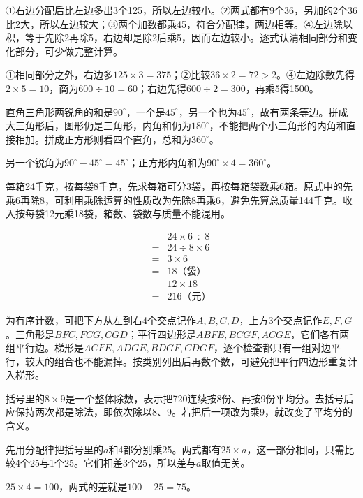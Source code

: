 \documentclass[multi=snippet,border=0pt]{standalone}
\newenvironment{snippet}[3]{\begin{minipage}{#1bp}\color{answerred}\fontsize{#2}{#3}\selectfont\raggedright}{\end{minipage}}
\begin{document}
\begin{snippet}{505}{11.5}{14}①右边分配后比左边多出3个125，所以左边较小。②两式都有9个36，另加的2个36比2大，所以左边较大；③两个加数都乘45，符合分配律，两边相等。④左边除以积，等于先除2再除5，右边却是除2后乘5，因而左边较小。逐式认清相同部分和变化部分，可少做完整计算。\par ①相同部分之外，右边多\(125\times3=375\)；②比较\(36\times2=72>2\)。④左边除数先得\(2\times5=10\)，商为\(600\div10=60\)；右边先得\(600\div2=300\)，再乘5得1500。\end{snippet}
\begin{snippet}{505}{11.5}{14}直角三角形两锐角的和是\(90^\circ\)，一个是\(45^\circ\)，另一个也为\(45^\circ\)，故有两条等边。拼成大三角形后，图形仍是三角形，内角和仍为\(180^\circ\)，不能把两个小三角形的内角和直接相加。拼成正方形则看四个直角，总和为\(360^\circ\)。\par 另一个锐角为\(90^\circ-45^\circ=45^\circ\)；正方形内角和为\(90^\circ\times4=360^\circ\)。\end{snippet}
\begin{snippet}{505}{11.5}{14}每箱24千克，按每袋8千克，先求每箱可分3袋，再按每箱袋数乘6箱。原式中的先乘6再除8，可利用乘除运算的性质改为先除8再乘6，避免先算总质量144千克。收入按每袋12元乘18袋，箱数、袋数与质量不能混用。\par \[\begin{aligned}&24\times6\div8\\={}&24\div8\times6\\={}&3\times6\\={}&18\text{（袋）}\\&12\times18\\={}&216\text{（元）}\end{aligned}\]\end{snippet}
\begin{snippet}{505}{11.5}{14}为有序计数，可把下方从左到右4个交点记作\(A,B,C,D\)，上方3个交点记作\(E,F,G\)。三角形是\(BFC,FCG,CGD\)；平行四边形是\(ABFE,BCGF,ACGE\)，它们各有两组平行边。梯形是\(ACFE,ADGE,BDGF,CDGF\)，逐个检查都只有一组对边平行，较大的组合也不能漏掉。按类别列出后再数个数，可避免把平行四边形重复计入梯形。\end{snippet}
\begin{snippet}{505}{11.5}{14}括号里的\(8\times9\)是一个整体除数，表示把720连续按8份、再按9份平均分。去括号后应保持两次都是除法，即依次除以8、9。若把后一项改为乘9，就改变了平均分的含义。\end{snippet}
\begin{snippet}{505}{11.5}{14}先用分配律把括号里的\(a\)和4都分别乘25。两式都有\(25\times a\)，这一部分相同，只需比较4个25与1个25。它们相差3个25，所以差与\(a\)取值无关。\par \(25\times4=100\)，两式的差就是\(100-25=75\)。\end{snippet}
\end{document}
